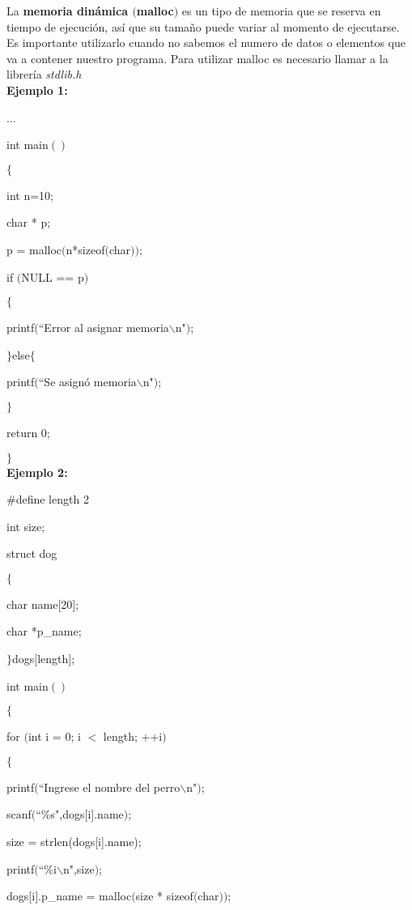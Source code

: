 \documentclass[]{article}
\begin{document}
	La \textbf{memoria dinámica $($malloc$)$} es un tipo de memoria que se reserva en tiempo de ejecución, así que su tamaño puede variar al momento de ejecutarse. Es importante utilizarlo cuando no sabemos el numero de datos o elementos que va a contener nuestro programa. Para utilizar malloc es necesario llamar a la librería \textit{stdlib.h}\\
	
	\textbf{Ejemplo 1:\\}
	
	...
	
	int main$()$
	
	$\lbrace$
	
	int n=10;
	
	char * p;
	
	p = malloc$($n*sizeof$($char$))$;
	
	if $($NULL == p$)$
	
	$\lbrace$
	
	printf$($``Error al asignar memoria$\backslash$n"$)$;
	
	$\rbrace$else$\lbrace$
	
	printf$($``Se asignó memoria$\backslash$n"$)$;
	
	$\rbrace$
	
	return 0;
	
	$\rbrace$\\
	
	
	\textbf{Ejemplo 2:\\}
	
	\#define length 2
	
	int size;
	
	struct dog
	
	$\lbrace$
	
	char name$[$20$]$;
	
	char *p\_name;
	
	$\rbrace$dogs$[$length$]$;
	
	int main$()$
	
	$\lbrace$
	
	for $($int i = 0; i $<$ length; ++i$)$
	
	$\lbrace$
	
	printf$($``Ingrese el nombre del perro$\backslash$n"$)$;
	
	scanf$($``\%s",dogs$[$i$]$.name$)$;
	
	size = strlen(dogs[i].name);
	
	printf$($``\%i$\backslash$n",size$)$;
	
	dogs$[$i$]$.p\_name = malloc$($size * sizeof$($char$))$;
	
\end{document}
